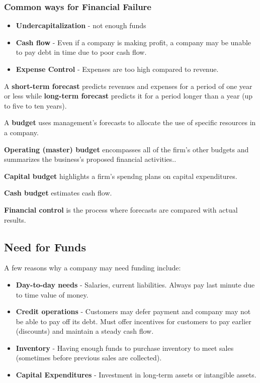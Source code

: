 \documentclass[english, 12pt]{article}
\begin{document}
\subsubsection*{Common ways for Financial Failure}
\begin{itemize}
\item \textbf{Undercapitalization} - not enough funds
\item \textbf{Cash flow} - Even if a company is making profit, a company may be unable to pay debt in time due to poor cash flow.
\item \textbf{Expense Control} - Expenses are too high compared to revenue.
\end{itemize}
\begin{defn}
A \textbf{short-term forecast} predicts revenues and expenses for a period of one year or less while \textbf{long-term forecast} predicts it for a period longer than a year (up to five to ten years).
\end{defn}
\begin{defn}
A \textbf{budget} uses management's forecasts to allocate the use of specific resources in a company.
\end{defn}
\begin{defn}
\textbf{Operating (master) budget} encompasses all of the firm's other budgets and summarizes the business's proposed financial activities..
\end{defn}
\begin{defn}
\textbf{Capital budget} highlights a firm's spendng plans on capital expenditures.
\end{defn}
\begin{defn}
\textbf{Cash budget} estimates cash flow.
\end{defn}
\begin{defn}
\textbf{Financial control} is the process where forecasts are compared with actual results.
\end{defn}
\subsection{Need for Funds}
A few reasons why a company may need funding include:
\begin{itemize}
\item \textbf{Day-to-day needs} - Salaries, current liabilities. Always pay last minute due to time value of money.
\item \textbf{Credit operations} - Customers may defer payment and company may not be able to pay off its debt. Must offer incentives for customers to pay earlier (discounts) and maintain a steady cash flow.
\item \textbf{Inventory} - Having enough funds to purchase inventory to meet sales (sometimes before previous sales are collected).
\item \textbf{Capital Expenditures} - Investment in long-term assets or intangible assets.
\end{itemize}
\end{document}
